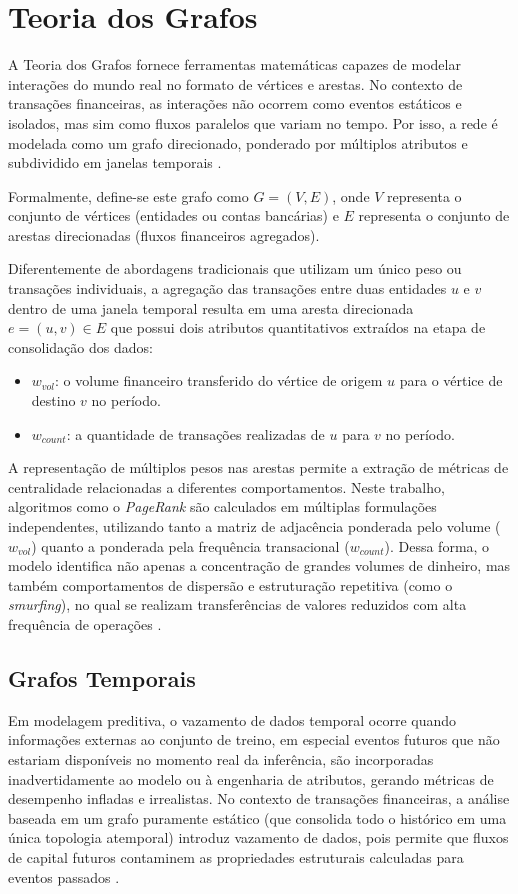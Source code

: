 \documentclass[titlepage,a4paper,oneside,onecolumn,12pt]{report}
\begin{document}
\section{Teoria dos Grafos}

A Teoria dos Grafos fornece ferramentas matemáticas capazes de modelar interações do mundo real no formato de vértices e arestas. No contexto de transações financeiras, as interações não ocorrem como eventos estáticos e isolados, mas sim como fluxos paralelos que variam no tempo. Por isso, a rede é modelada como um grafo direcionado, ponderado por múltiplos atributos e subdividido em janelas temporais \cite{oliveira2025complex}.

Formalmente, define-se este grafo como $G = (V, E)$, onde $V$ representa o conjunto de vértices (entidades ou contas bancárias) e $E$ representa o conjunto de arestas direcionadas (fluxos financeiros agregados). 

Diferentemente de abordagens tradicionais que utilizam um único peso ou transações individuais, a agregação das transações entre duas entidades $u$ e $v$ dentro de uma janela temporal resulta em uma aresta direcionada $e = (u, v) \in E$ que possui dois atributos quantitativos extraídos na etapa de consolidação dos dados:
\begin{itemize}
    \item $w_{vol}$: o volume financeiro transferido do vértice de origem $u$ para o vértice de destino $v$ no período.
    \item $w_{count}$: a quantidade de transações realizadas de $u$ para $v$ no período.
\end{itemize}

A representação de múltiplos pesos nas arestas permite a extração de métricas de centralidade relacionadas a diferentes comportamentos. Neste trabalho, algoritmos como o \textit{PageRank} são calculados em múltiplas formulações independentes, utilizando tanto a matriz de adjacência ponderada pelo volume ($w_{vol}$) quanto a ponderada pela frequência transacional ($w_{count}$). Dessa forma, o modelo identifica não apenas a concentração de grandes volumes de dinheiro, mas também comportamentos de dispersão e estruturação repetitiva (como o \textit{smurfing}), no qual se realizam transferências de valores reduzidos com alta frequência de operações \cite{vilella2025weirdnodes}.

\subsection{Grafos Temporais}
\label{subsec:grafos_temporais}
Em modelagem preditiva, o vazamento de dados temporal ocorre quando informações externas ao conjunto de treino, em especial eventos futuros que não estariam disponíveis no momento real da inferência, são incorporadas inadvertidamente ao modelo ou à engenharia de atributos, gerando métricas de desempenho infladas e irrealistas. No contexto de transações financeiras, a análise baseada em um grafo puramente estático (que consolida todo o histórico em uma única topologia atemporal) introduz vazamento de dados, pois permite que fluxos de capital futuros contaminem as propriedades estruturais calculadas para eventos passados \cite{sizan2025machine}.
\end{document}
